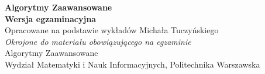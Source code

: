 




\begin{titlepage}
	\centering
	\vspace*{2cm}
	{\LARGE\bfseries\color{accent} Algorytmy Zaawansowane}\\[0.5cm]
	{\large\bfseries\color{accentB} Wersja egzaminacyjna}\\[0.5cm]
	{\normalsize Opracowane na podstawie wykładów Michała Tuczyńskiego}\\[0.5cm]
	{\small\itshape Okrojone do materiału obowiązującego na egzaminie}\\[2cm]

	\vfill
	{\small Algorytmy Zaawansowane\\
		Wydział Matematyki i Nauk Informacyjnych, Politechnika Warszawska}
\end{titlepage}

\tableofcontents
\newpage















